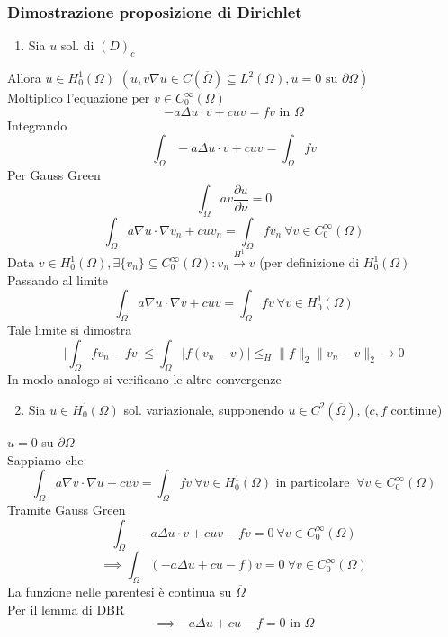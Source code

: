 \documentclass[a4paper]{article}
\begin{document}
\subsubsection{Dimostrazione proposizione di Dirichlet}
\begin{enumerate}
	\item Sia $u$ sol. di $(D)_c$

\end{enumerate}
Allora $u\in H_0^1(\Omega)$ $(u,v\nabla u\in C(\overline{\Omega})\subseteq  L^{2}(\Omega),u=0\text{ su }\partial\Omega)$
\\Moltiplico l'equazione per $v\in C_0^\infty(\Omega)$ 
\[-a\Delta u\cdot v+cuv=fv\text{ in }\Omega\]
Integrando
\[\int_{\Omega}^{} -a\Delta u\cdot v+cuv=\int_{\Omega}^{} fv\]
Per Gauss Green
\[\int_{\Omega}^{} av \frac{\partial u}{\partial \nu}=0\]
\[\int_{\Omega}^{} a\nabla u\cdot \nabla v_n+cuv_n=\int_{\Omega}^{} fv_n\ \forall v\in C_0^\infty(\Omega) \]
Data $v\in H_0^1(\Omega),\exists \{v_n\} \subseteq  C_0^\infty(\Omega):v_n\xrightarrow{H^1}v$ (per definizione di $H^1_0(\Omega)$ 
\\Passando al limite
\[\int_{\Omega}^{} a\nabla u\cdot \nabla v+cuv=\int_{\Omega}^{} fv\ \forall v\in H_0^1(\Omega) \]
Tale limite si dimostra
\[\bigg|\int_{\Omega}^{} fv_n-fv\bigg|\le \int_{\Omega}^{} |f(v_n-v)|\le_H \|f\|_2 \|v_n-v\|_2\to 0\]
In modo analogo si verificano le altre convergenze
\begin{enumerate}
	\setcounter{enumi}{1}
	\item Sia $u\in H_0^1(\Omega)$ sol. variazionale, supponendo $u\in C^2(\overline{\Omega})$, ($c,f$ continue)
\end{enumerate}
$u=0$ su $\partial\Omega$ 
\\Sappiamo che
\[\int_{\Omega}^{} a\nabla v\cdot \nabla u+cuv=\int_{\Omega}^{} fv\ \forall v\in H^1_0(\Omega)\text{ in particolare }\ \forall v\in C_0^\infty(\Omega)\]
Tramite Gauss Green
\[\int_{\Omega}^{} -a\Delta u\cdot v+cuv-fv=0\ \forall v\in C_0^\infty(\Omega)\]
\[\implies \int_{\Omega}^{} (-a\Delta u+cu -f)v=0\ \forall v\in C_0^\infty(\Omega)\]
La funzione nelle parentesi è continua su $\overline{\Omega}$
\\Per il lemma di DBR
\[\implies -a\Delta u+cu-f=0\text{ in }\Omega\]
\end{document}
